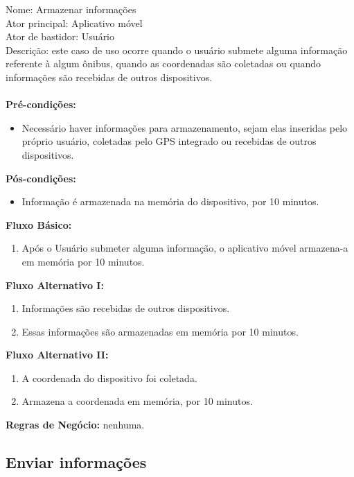 \noindent Nome: Armazenar informações\\
Ator principal:	Aplicativo móvel\\
Ator de bastidor: Usuário\\
Descrição: este caso de uso ocorre quando o usuário submete alguma informação referente à algum ônibus, quando as coordenadas são coletadas ou quando informações são recebidas de outros dispositivos.\\\\
\textbf{Pré-condições:}
	\begin{itemize}
		\item Necessário haver informações para armazenamento, sejam elas inseridas pelo próprio usuário, coletadas pelo GPS integrado ou recebidas de outros dispositivos.
	\end{itemize}
\textbf{Pós-condições:}
	\begin{itemize}
		\item Informação é armazenada na memória do dispositivo, por 10 minutos.
	\end{itemize}	
\textbf{Fluxo Básico:}
	\begin{enumerate}
		\item Após o Usuário submeter alguma informação, o aplicativo móvel armazena-a em memória por 10 minutos.
	\end{enumerate}	
\textbf{Fluxo Alternativo I:}
	\begin{enumerate}
		\item Informações são recebidas de outros dispositivos.
		\item Essas informações são armazenadas em memória por 10 minutos.
	\end{enumerate}
\textbf{Fluxo Alternativo II:}
	\begin{enumerate}
		\item A coordenada do dispositivo foi coletada.
		\item Armazena a coordenada em memória, por 10 minutos.
	\end{enumerate}
\textbf{Regras de Negócio:}	nenhuma.

\subsection{Enviar informações }

